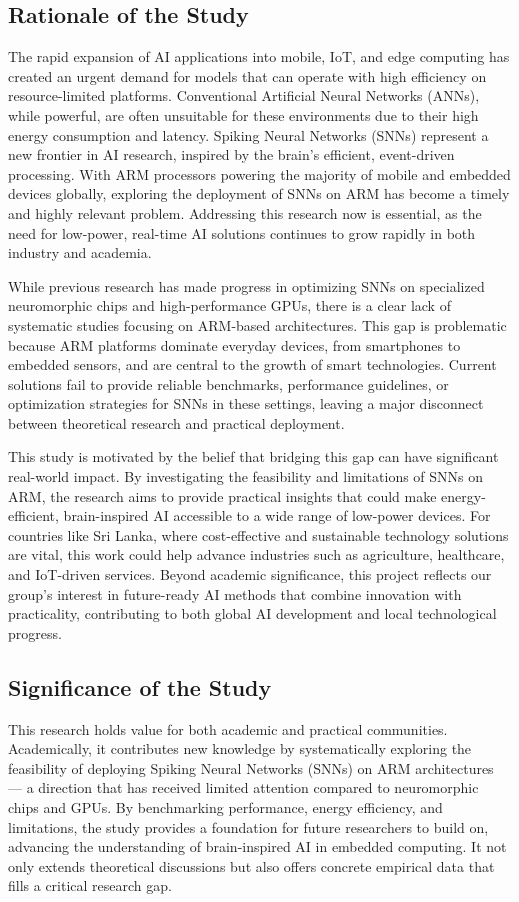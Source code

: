 \documentclass[a4paper,12pt]{article}
\begin{document}
	\subsection{Rationale of the Study}
	The rapid expansion of AI applications into mobile, IoT, and edge computing has created an urgent demand for models that can operate with high efficiency on resource-limited platforms. Conventional Artificial Neural Networks (ANNs), while powerful, are often unsuitable for these environments due to their high energy consumption and latency. Spiking Neural Networks (SNNs) represent a new frontier in AI research, inspired by the brain’s efficient, event-driven processing. With ARM processors powering the majority of mobile and embedded devices globally, exploring the deployment of SNNs on ARM has become a timely and highly relevant problem. Addressing this research now is essential, as the need for low-power, real-time AI solutions continues to grow rapidly in both industry and academia.
	
	While previous research has made progress in optimizing SNNs on specialized neuromorphic chips and high-performance GPUs, there is a clear lack of systematic studies focusing on ARM-based architectures. This gap is problematic because ARM platforms dominate everyday devices, from smartphones to embedded sensors, and are central to the growth of smart technologies. Current solutions fail to provide reliable benchmarks, performance guidelines, or optimization strategies for SNNs in these settings, leaving a major disconnect between theoretical research and practical deployment.
	
	This study is motivated by the belief that bridging this gap can have significant real-world impact. By investigating the feasibility and limitations of SNNs on ARM, the research aims to provide practical insights that could make energy-efficient, brain-inspired AI accessible to a wide range of low-power devices. For countries like Sri Lanka, where cost-effective and sustainable technology solutions are vital, this work could help advance industries such as agriculture, healthcare, and IoT-driven services. Beyond academic significance, this project reflects our group’s interest in future-ready AI methods that combine innovation with practicality, contributing to both global AI development and local technological progress.
	
	\subsection{Significance of the Study}
	This research holds value for both academic and practical communities. Academically, it contributes new knowledge by systematically exploring the feasibility of deploying Spiking Neural Networks (SNNs) on ARM architectures — a direction that has received limited attention compared to neuromorphic chips and GPUs. By benchmarking performance, energy efficiency, and limitations, the study provides a foundation for future researchers to build on, advancing the understanding of brain-inspired AI in embedded computing. It not only extends theoretical discussions but also offers concrete empirical data that fills a critical research gap.
	
\end{document}
